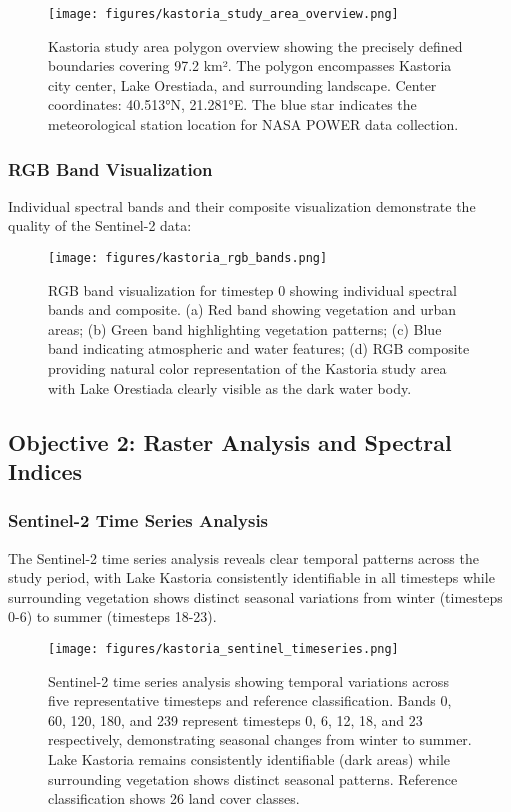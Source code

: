 \documentclass[a4paper,12pt]{article}
\begin{document}
\begin{figure}[H]
    \centering
    \texttt{[image: figures/kastoria\_study\_area\_overview.png]}
    \caption{Kastoria study area polygon overview showing the precisely defined boundaries covering 97.2 km². The polygon encompasses Kastoria city center, Lake Orestiada, and surrounding landscape. Center coordinates: 40.513°N, 21.281°E. The blue star indicates the meteorological station location for NASA POWER data collection.}
    \label{fig:study_area}
\end{figure}

\subsubsection{RGB Band Visualization}

Individual spectral bands and their composite visualization demonstrate the quality of the Sentinel-2 data:

\begin{figure}[H]
    \centering
    \texttt{[image: figures/kastoria\_rgb\_bands.png]}
    \caption{RGB band visualization for timestep 0 showing individual spectral bands and composite. (a) Red band showing vegetation and urban areas; (b) Green band highlighting vegetation patterns; (c) Blue band indicating atmospheric and water features; (d) RGB composite providing natural color representation of the Kastoria study area with Lake Orestiada clearly visible as the dark water body.}
    \label{fig:rgb_bands}
\end{figure}

\subsection{Objective 2: Raster Analysis and Spectral Indices}

\subsubsection{Sentinel-2 Time Series Analysis}

The Sentinel-2 time series analysis reveals clear temporal patterns across the
study period, with Lake Kastoria consistently identifiable in all timesteps
while surrounding vegetation shows distinct seasonal variations from winter
(timesteps 0-6) to summer (timesteps 18-23).

\begin{figure}[H]
    \centering
    \texttt{[image: figures/kastoria\_sentinel\_timeseries.png]}
    \caption{Sentinel-2 time series analysis showing temporal variations across five representative timesteps and reference classification. Bands 0, 60, 120, 180, and 239 represent timesteps 0, 6, 12, 18, and 23 respectively, demonstrating seasonal changes from winter to summer. Lake Kastoria remains consistently identifiable (dark areas) while surrounding vegetation shows distinct seasonal patterns. Reference classification shows 26 land cover classes.}
    \label{fig:sentinel_timeseries}
\end{figure}
\end{document}
